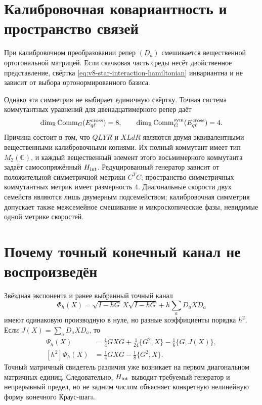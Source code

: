 \section{Калибровочная ковариантность и пространство связей}

При калибровочном преобразовании репер $(D_a)$ смешивается вещественной
ортогональной матрицей. Если скачковая часть среды несёт двойственное
представление, свёртка \eqref{eq:v8-star-interaction-hamiltonian}
инвариантна и не зависит от выбора ортонормированного базиса.

Однако эта симметрия не выбирает единичную свёртку. Точная система
коммутантных уравнений для двенадцатимерного репер даёт
\begin{equation}
 \dim_{\mathbb R}\operatorname{Comm}_G(E_{q\ell}^{\rm cross})=8,
 \qquad
 \dim_{\mathbb R}\operatorname{Comm}^{\rm sym}_G
 (E_{q\ell}^{\rm cross})=4.
 \label{eq:v8-star-coupling-commutant-dimensions}
\end{equation}
Причина состоит в том, что $QLYR$ и $XLdR$ являются двумя эквивалентными
вещественными калибровочными копиями. Их полный коммутант имеет тип $M_2(\mathbb C)$,
и каждый вещественный элемент этого восьмимерного коммутанта задаёт
самосопряжённый $H_{\rm int}$. Редуцированный генератор зависит от
положительной симметричной метрики $C^TC$; пространство симметричных
коммутантных метрик имеет размерность $4$. Диагональные скорости двух
семейств являются лишь двумерным подсемейством; калибровочная симметрия допускает
также межсемейное смешивание и микроскопические фазы, невидимые одной
метрике скоростей.

\section{Почему точный конечный канал не воспроизведён}

Звёздная экспонента и ранее выбранный точный канал
\begin{equation}
 \Phi_h(X)=\sqrt{I-hG}\,X\sqrt{I-hG}
 +h\sum_aD_aXD_a
\end{equation}
имеют одинаковую производную в нуле, но разные коэффициенты порядка $h^2$.
Если $J(X)=\sum_aD_aXD_a$, то
\begin{align}
 [h^2]\Psi_h(X)
 &=\frac14GXG+\frac1{24}\{G^2,X\}
   -\frac16\{G,J(X)\},\\
 [h^2]\Phi_h(X)
 &=\frac14GXG-\frac18\{G^2,X\}.
\end{align}
Точный матричный свидетель различия уже возникает на первом диагональном
матричных единиц. Следовательно, $H_{\rm int}$ выводит требуемый генератор и
непрерывный предел, но не задним числом объясняет конкретную нелинейную
форму конечного Краус-шагa.

